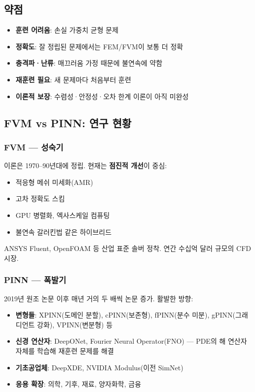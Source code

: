 \documentclass[11pt,a4paper]{article}
\begin{document}
\subsection{약점}

\begin{itemize}[leftmargin=*, itemsep=2pt]
  \item \textbf{훈련 어려움}: 손실 가중치 균형 문제
  \item \textbf{정확도}: 잘 정립된 문제에서는 FEM/FVM이 보통 더 정확
  \item \textbf{충격파·난류}: 매끄러움 가정 때문에 불연속에 약함
  \item \textbf{재훈련 필요}: 새 문제마다 처음부터 훈련
  \item \textbf{이론적 보장}: 수렴성·안정성·오차 한계 이론이 아직 미완성
\end{itemize}

\subsection{FVM vs PINN: 연구 현황}

\subsubsection{FVM --- 성숙기}

이론은 1970--90년대에 정립. 현재는 \textbf{점진적 개선}이 중심:
\begin{itemize}[leftmargin=*, itemsep=1pt]
  \item 적응형 메쉬 미세화(AMR)
  \item 고차 정확도 스킴
  \item GPU 병렬화, 엑사스케일 컴퓨팅
  \item 불연속 갈러킨법 같은 하이브리드
\end{itemize}

ANSYS Fluent, OpenFOAM 등 산업 표준 솔버 정착. 연간 수십억 달러 규모의 CFD 시장.

\subsubsection{PINN --- 폭발기}

2019년 원조 논문 이후 매년 거의 두 배씩 논문 증가. 활발한 방향:

\begin{itemize}[leftmargin=*, itemsep=1pt]
  \item \textbf{변형들}: XPINN(도메인 분할), cPINN(보존형), fPINN(분수 미분), gPINN(그래디언트 강화), VPINN(변분형) 등
  \item \textbf{신경 연산자}: DeepONet, Fourier Neural Operator(FNO) --- PDE의 해 연산자 자체를 학습해 재훈련 문제를 해결
  \item \textbf{기초공업체}: DeepXDE, NVIDIA Modulus(이전 SimNet)
  \item \textbf{응용 확장}: 의학, 기후, 재료, 양자화학, 금융
\end{itemize}
\end{document}
